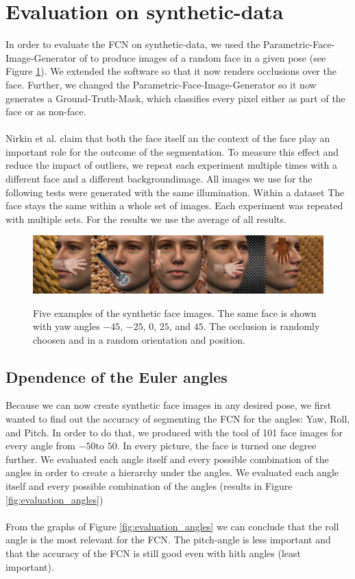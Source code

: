\section{Evaluation on synthetic-data}
In order to evaluate the FCN on synthetic-data, we used the Parametric-Face-Image-Generator of \cite{parametric} to produce images of a random face in a given pose (see Figure \ref{fig:syntheticData_samples}). We extended the software so that it now renders occlusions over the face. Further, we changed the Parametric-Face-Image-Generator so it now generates a Ground-Truth-Mask, which classifies every pixel either as part of the face or as non-face.\\
\\
Nirkin et al. \cite{nirkin2018_faceswap} claim that both the face itself an the context of the face play an important role for the outcome of the segmentation. To measure this effect and reduce the impact of outliers, we repeat each experiment multiple times with a different face and a different backgroundimage. All images we use for the following tests were generated with the same illumination. Within a dataset The face stays the same within a whole set of images. Each experiment was repeated with multiple sets. For the results we use the average of all results.

\begin{figure}[h]
	\centering
	\includegraphics[width=\textwidth]{Figures/chap2/syntheticData_samples.png}
	\label{fig:syntheticData_samples}
	\caption{Five examples of the synthetic face images. The same face is shown with yaw angles $-45$\textdegree, $-25$\textdegree, $0$\textdegree, $25$\textdegree, and $45$\textdegree. The occlusion is randomly choosen and in a random orientation and position.}
\end{figure}

\subsection{Dpendence of the Euler angles}
Because we can now create synthetic face images in any desired pose, we first wanted to find out the accuracy of segmenting the FCN for the angles: Yaw, Roll, and Pitch. In order to do that, we produced with the tool of \cite{parametric} 101 face images for every angle from $-50$\textdegree to $50$\textdegree. In every picture, the face is turned one degree further. We evaluated each angle itself and every possible combination of the angles in order to create a hierarchy under the angles. We evaluated each angle itself and every possible combination of the angles (results in Figure \ref{fig:evaluation_angles})\\
\\
From the graphs of Figure \ref{fig:evaluation_angles} we can conclude that the roll angle is the most relevant for the FCN. The pitch-angle is less important and that the accuracy of the FCN is still good even with hith angles (least important). 

